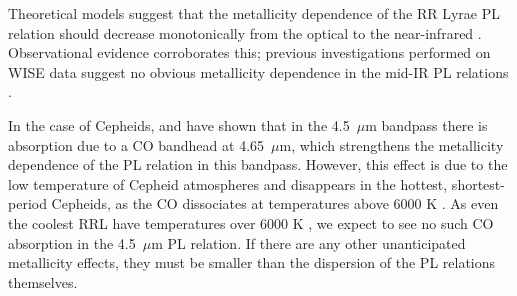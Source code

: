 \documentclass[a4paper,fleqn,usenatbib]{mnras}
\begin{document}


Theoretical models suggest that the metallicity dependence of the RR Lyrae PL relation should decrease monotonically from the optical to the near-infrared \citep{2001MNRAS.326.1183B, 2004ApJS..154..633C}. Observational evidence corroborates this; previous investigations performed on WISE data suggest no obvious metallicity dependence in the mid-IR PL relations \citep{2013ApJ...776..135M}.

In the case of Cepheids, \citet{2011ApJ...743...76S} and \citet{2015arXiv150206995S} have shown that in the 4.5~$\mu$m bandpass there is absorption due to a CO bandhead at 4.65~$\mu$m, which strengthens the metallicity dependence of the PL relation in this bandpass. However, this effect is due to the low temperature of Cepheid atmospheres and disappears in the hottest, shortest-period Cepheids, as the CO dissociates at temperatures above 6000 K \citep{2012ApJ...759..146M}. As even the coolest RRL have temperatures over 6000 K \citep{1971PASP...83..697I}, we expect to see no such CO absorption in the 4.5~$\mu$m PL relation. If there are any other unanticipated metallicity effects, they must be smaller than the dispersion of the PL relations themselves.
\end{document}
